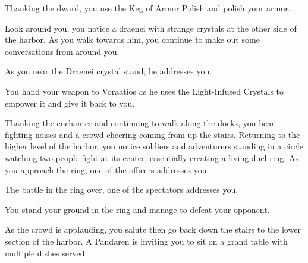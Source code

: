 Thanking the dward, you use the Keg of Armor Polish and polish your armor.

Look around you, you notice a draenei with strange crystals at the other side of the harbor. As you walk towards him, you continue to make out some conversations from around you.




As you near the Draenei crystal stand, he addresses you.


You hand your weapon to Voraatios as he uses the Light-Infused Crystals to empower it and give it back to you.

Thanking the enchanter and continuing to walk along the docks, you hear fighting noises and a crowd cheering coming from up the stairs. Returning to the higher level of the harbor, you notice soldiers and adventurers standing in a circle watching two people fight at its center, essentially creating a living duel ring. As you approach the ring, one of the officers addresses you.


The battle in the ring over, one of the spectators addresses you.



You stand your ground in the ring and manage to defeat your opponent.


As the crowd is applauding, you salute then go back down the stairs to the lower section of the harbor. A Pandaren is inviting you to sit on a grand table with multiple dishes served.

